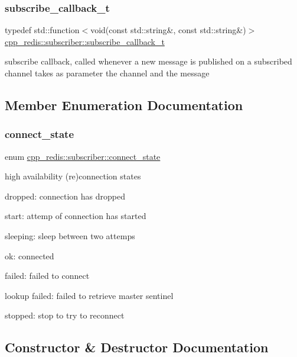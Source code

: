 \subsubsection{\texorpdfstring{subscribe\+\_\+callback\+\_\+t}{subscribe\_callback\_t}}
{\footnotesize\ttfamily typedef std\+::function$<$void(const std\+::string\&, const std\+::string\&)$>$ \hyperlink{classcpp__redis_1_1subscriber_ac6ab8ebc526d784e4b79a39bbd73dca8}{cpp\+\_\+redis\+::subscriber\+::subscribe\+\_\+callback\+\_\+t}}

subscribe callback, called whenever a new message is published on a subscribed channel takes as parameter the channel and the message 

\subsection{Member Enumeration Documentation}
\mbox{\label{classcpp__redis_1_1subscriber_afc976757efd9d0ac4def6935546a2338}} 
\subsubsection{\texorpdfstring{connect\+\_\+state}{connect\_state}}
{\footnotesize\ttfamily enum \hyperlink{classcpp__redis_1_1subscriber_afc976757efd9d0ac4def6935546a2338}{cpp\+\_\+redis\+::subscriber\+::connect\+\_\+state}\hspace{0.3cm}{\ttfamily [strong]}}

high availability (re)connection states
\begin{DoxyItemize}
\item dropped\+: connection has dropped
\item start\+: attemp of connection has started
\item sleeping\+: sleep between two attemps
\item ok\+: connected
\item failed\+: failed to connect
\item lookup failed\+: failed to retrieve master sentinel
\item stopped\+: stop to try to reconnect 
\end{DoxyItemize}

\subsection{Constructor \& Destructor Documentation}
\mbox{\label{classcpp__redis_1_1subscriber_a66136601f44564842e2c67de2da199af}} 
